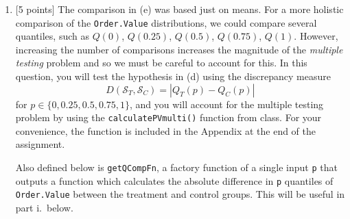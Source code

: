 \documentclass[
]{article}
\newenvironment{Shaded}{\begin{snugshade}}{\end{snugshade}}
\newcommand{\ControlFlowTok}[1]{\textcolor[rgb]{0.13,0.29,0.53}{\textbf{#1}}}
\newcommand{\DecValTok}[1]{\textcolor[rgb]{0.00,0.00,0.81}{#1}}
\newcommand{\FunctionTok}[1]{\textcolor[rgb]{0.13,0.29,0.53}{\textbf{#1}}}
\newcommand{\NormalTok}[1]{#1}
\newcommand{\OtherTok}[1]{\textcolor[rgb]{0.56,0.35,0.01}{#1}}
\newcommand{\SpecialCharTok}[1]{\textcolor[rgb]{0.81,0.36,0.00}{\textbf{#1}}}
\begin{document}
\begin{enumerate}
\def\labelenumi{(\alph{enumi})}
\setcounter{enumi}{5}
\item
  {[}5 points{]} The comparison in (e) was based just on means. For a
  more holistic comparison of the \texttt{Order.Value} distributions, we
  could compare several quantiles, such as \(Q(0)\), \(Q(0.25)\),
  \(Q(0.5)\), \(Q(0.75)\), \(Q(1)\). However, increasing the number of
  comparisons increases the magnitude of the \emph{multiple testing}
  problem and so we must be careful to account for this. In this
  question, you will test the hypothesis in (d) using the discrepancy
  measure \[D(\mathcal{S}_{T},\mathcal{S}_{C}) = |Q_T(p) - Q_C(p)|\] for
  \(p\in\{0,0.25,0.5,0.75,1\}\), and you will account for the multiple
  testing problem by using the \texttt{calculatePVmulti()} function from
  class. For your convenience, the function is included in the Appendix
  at the end of the assignment.

  Also defined below is \texttt{getQCompFn}, a factory function of a
  single input \texttt{p} that outputs a function which calculates the
  absolute difference in \texttt{p} quantiles of \texttt{Order.Value}
  between the treatment and control groups. This will be useful in part
  i.~below.

\begin{Shaded}
\end{Shaded}


\end{enumerate}
\end{document}
